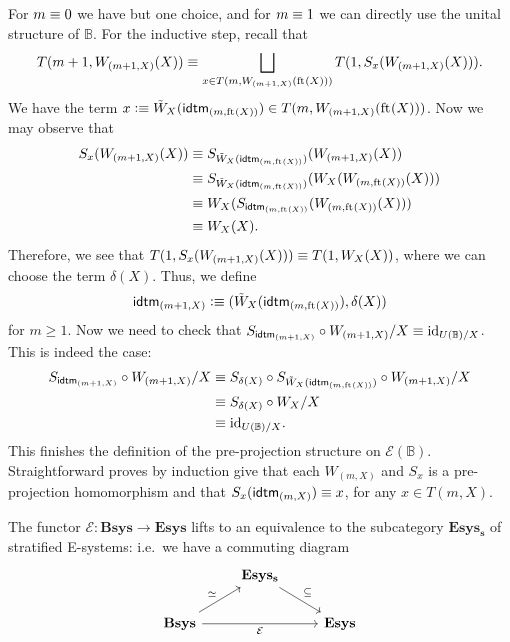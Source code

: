 \begin{constr}
For $m\equiv 0$ we have but one
choice, and for $m\equiv 1$ we can directly use the unital structure of
$\mathbb{B}$. For the inductive step, recall that
\begin{equation*}
T(m+1,W_{(m+1,X)}(X))\equiv\bigsqcup_{x\in T(m,W_{(m+1,X)}(\mathrm{ft}_{}(X)))}T(1,S_x(W_{(m+1,X)}(X))).
\end{equation*}
We have the term $x\defeq \tilde{W}_X(\tfid{(m,\eft(X))})\in T(m,W_{(m+1,X)}(\eft(X)))$.
Now we may observe that 
\begin{align*}
S_x(W_{(m+1,X)}(X))
  & \jdeq 
S_{\tilde{W}_X(\tfid{(m,\eft(X))})}(W_{(m+1,X)}(X))\\
  & \jdeq 
S_{\tilde{W}_X(\tfid{(m,\eft(X))})}(W_X(W_{(m,\eft(X))}(X))) \\
  & \jdeq
W_{X}(S_{\tfid{(m,\eft(X))}}(W_{(m,\eft(X))}(X))) \\
  & \jdeq 
W_{X}(X).
\end{align*}
Therefore, we see that $T(1,S_x(W_{(m+1,X)}(X)))\equiv T(1,W_X(X))$, where we can
choose the term $\delta(X)$. Thus, we define
\begin{equation*}
\tfid{(m+1,X)}\defeq (\tilde{W}_X(\tfid{(m,\eft(X))}),\delta(X))
\end{equation*} 
for $m\geq 1$. Now we need to check that $S_{\tfid{(m+1,X)}}\circ 
W_{(m+1,X)}/X\jdeq \catid{U(\mathbb{B})/X}$. This is indeed the case:
\begin{align*}
S_{\tfid{(m+1,X)}}\circ W_{(m+1,X)}/X
  & \jdeq
S_{\delta(X)}\circ S_{\tilde{W}_X(\tfid{(m,\eft(X))})}\circ W_{(m+1,X)}/X \\
  & \jdeq
S_{\delta(X)}\circ W_X/X \\
  & \jdeq
\catid{U(\mathbb{B})/X}.
\end{align*}
This finishes the definition of the pre-projection structure on $\mathcal{E}(\mathbb{B})$.
Straightforward proves by induction give that each $W_{(m,X)}$ and $S_x$ is a 
pre-projection homomorphism and that $S_x(\tfid{(m,X)})\jdeq x$, for any 
$x\in T(m,X)$.
\end{constr}

\begin{thm}
The functor $\mathcal{E}:\mathbf{Bsys}\to\mathbf{Esys}$ lifts to an equivalence
to the subcategory $\mathbf{Esys_s}$ of stratified E-systems: i.e.~we have a
commuting diagram
\begin{equation*}
\begin{tikzcd}
& \mathbf{Esys_s} \arrow[dr,"\subseteq"]\\
\mathbf{Bsys} \arrow[ur,"\simeq"] \arrow[rr,swap,"\mathcal{E}"] & & \mathbf{Esys}
\end{tikzcd}
\end{equation*}
\end{thm}

